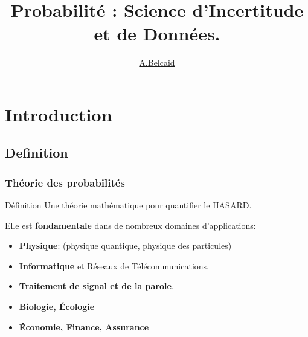 \documentclass{beamer}
\title{Probabilité : Science d'Incertitude et de Données.}
\author{\underline{A.Belcaid}}
\institute{\small ENSA-Safi}
\begin{document}
\maketitle

\begin{frame}
\tableofcontents
\end{frame}

\section{Introduction}

\subsection{Definition}
\begin{frame}[<+->]
    \frametitle{Théorie des probabilités}

    \begin{block}{Définition}
        Une théorie mathématique pour quantifier le \alert{HASARD}.
    \end{block}

Elle est \textbf{fondamentale} dans de nombreux domaines d'applications:

\begin{itemize}
    \small
    \item \textbf{Physique}: (physique quantique, physique des
        particules)\\[.2cm]
    \item \textbf{Informatique} et Réseaux de Télécommunications.\\[.2cm]
    \item \textbf{Traitement de signal et de la parole}.\\[.2cm]
    \item \textbf{Biologie, Écologie}\\[.2cm]
    \item \textbf{Économie, Finance, Assurance}\\[.2cm]
        
\end{itemize}

\end{frame}
\end{document}
